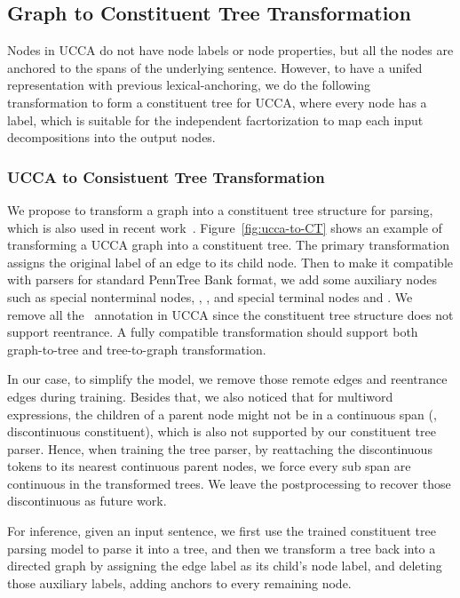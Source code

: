 
\subsection{Graph to Constituent Tree Transformation}
\label{ssec:phr:graph-ct}
Nodes in UCCA do not have node labels or node properties, but all the
nodes are anchored to the spans of the underlying sentence. However,
to have a unifed representation with previous lexical-anchoring, we do
the following transformation to form a constituent tree for UCCA,
where every node has a label, which is suitable for the independent
facrtorization to map each input decompositions into the output nodes.

\subsubsection{UCCA to Consistuent Tree Transformation}
\label{sssec:phr:ucca-to-ct}
We propose to transform a graph into a constituent tree structure for
parsing, which is also used in recent work~\cite{jiang2019hlt}.
Figure~\ref{fig:ucca-to-CT} shows an example of transforming a UCCA
graph into a constituent tree. The primary transformation assigns the
original label of an edge to its child node. Then to make it
compatible with parsers for standard PennTree Bank format, we add some
auxiliary nodes such as special nonterminal nodes, ,
, and special terminal nodes  and . We
remove all the~ annotation in UCCA since the
constituent tree structure does not support reentrance.  A fully
compatible transformation should support both graph-to-tree and
tree-to-graph transformation.

In our case, to simplify the model, we remove those remote edges and
reentrance edges during training. Besides that, we also noticed that
for multiword expressions, the children of a parent node might not be
in a continuous span (\eg, discontinuous constituent), which is also
not supported by our constituent tree parser. Hence, when training the
tree parser, by reattaching the discontinuous tokens to its nearest
continuous parent nodes, we force every sub span are continuous in the
transformed trees. We leave the postprocessing to recover those
discontinuous as future work.

For inference, given an input sentence, we first use the trained
constituent tree parsing model to parse it into a tree, and then we
transform a tree back into a directed graph by assigning the edge
label as its child's node label, and deleting those auxiliary labels,
adding anchors to every remaining node.


